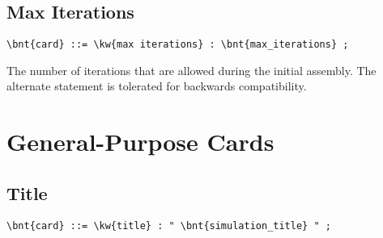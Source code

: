 \subsection{Max Iterations}
\begin{Verbatim}[commandchars=\\\{\}]
    \bnt{card} ::= \kw{max iterations} : \bnt{max_iterations} ;
\end{Verbatim}
The number of iterations that are allowed during the initial assembly.
The alternate statement  is tolerated
for backwards compatibility.



\section{General-Purpose Cards}

\subsection{Title}
\begin{Verbatim}[commandchars=\\\{\}]
    \bnt{card} ::= \kw{title} : " \bnt{simulation_title} " ;
\end{Verbatim}

